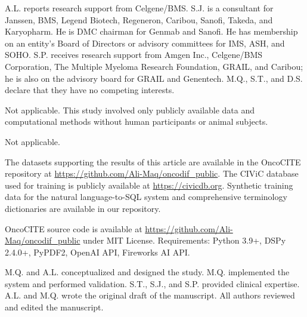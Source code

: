 
A.L. reports research support from Celgene/BMS. S.J. is a consultant for Janssen, BMS, Legend Biotech, Regeneron, Caribou, Sanofi, Takeda, and Karyopharm. He is DMC chairman for Genmab and Sanofi. He has membership on an entity's Board of Directors or advisory committees for IMS, ASH, and SOHO. S.P. receives research support from Amgen Inc., Celgene/BMS Corporation, The Multiple Myeloma Research Foundation, GRAIL, and Caribou; he is also on the advisory board for GRAIL and Genentech. M.Q., S.T., and D.S. declare that they have no competing interests.


Not applicable. This study involved only publicly available data and computational methods without human participants or animal subjects.


Not applicable.


The datasets supporting the results of this article are available in the OncoCITE repository at \url{https://github.com/Ali-Maq/oncodif_public}. The CIViC database used for training is publicly available at \url{https://civicdb.org}. Synthetic training data for the natural language-to-SQL system and comprehensive terminology dictionaries are available in our repository.


OncoCITE source code is available at \url{https://github.com/Ali-Maq/oncodif_public} under MIT License. Requirements: Python 3.9+, DSPy 2.4.0+, PyPDF2, OpenAI API, Fireworks AI API.


M.Q. and A.L. conceptualized and designed the study. M.Q. implemented the system and performed validation. S.T., S.J., and S.P. provided clinical expertise. A.L. and M.Q. wrote the original draft of the manuscript. All authors reviewed and edited the manuscript.

